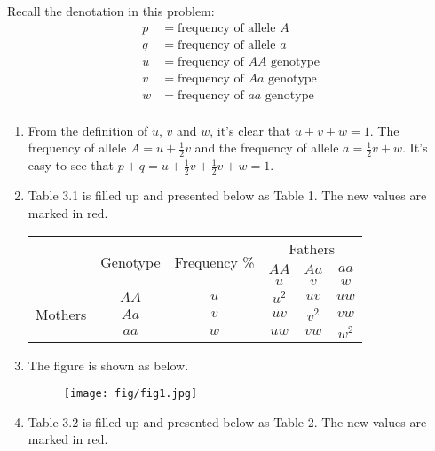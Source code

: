 \begin{homeworkProblem}[18]
Recall the denotation in this problem:
\[
    \begin{aligned}
        p &= \text{frequency of allele }A \\
        q &= \text{frequency of allele }a \\
        u &= \text{frequency of }AA\text{ genotype} \\
        v &= \text{frequency of }Aa\text{ genotype}  \\
        w &= \text{frequency of }aa\text{ genotype}  \\
    \end{aligned}
\]
\begin{enumerate}
\item From the definition of $u$, $v$ and $w$, it's clear that $u +v + w = 1$.
The frequency of allele $A = u + \frac{1}{2}v$ and the frequency of allele $a
= \frac{1}{2}v + w$. It's easy to see that $p + q = u + \frac{1}{2}v + \frac{1}{2}
v + w = 1$.
\item Table 3.1 is filled up and presented below as Table 1.
The new values are marked in red.
\begin{table}[h!]
\centering
\begin{tabular}{|c|c|c|c|c|c|}
\hline
\multirow{3}{*}{ } &
\multirow{3}{*}{Genotype} &
\multirow{3}{*}{Frequency \%} &
\multicolumn{3}{|c|}{Fathers}\\
\cline{4-6}
& & & $AA$ & $Aa$ & $aa$ \\ \cline{4-6}
& & & $u$ & $v$ & $w$ \\
\hline
\multirow{3}{*}{Mothers} & $AA$ & $u$ & $u^2$ & $uv$ & $uw$\\
& $Aa$ & $v$ & {\color{red} $uv$} & $v^2$ & {\color{red} $vw$}\\
& $aa$ & $w$ & {\color{red} $uw$} & {\color{red}$vw$} & {\color{red}$w^2$} \\
\hline
\end{tabular}
\end{table}

\item The figure is shown as below.
\begin{figure}[h]
    \centering
    \texttt{[image: fig/fig1.jpg]}
\end{figure}

\item Table 3.2 is filled up and presented below as Table 2.
The new values are marked in red.


\end{enumerate}
\end{homeworkProblem}
